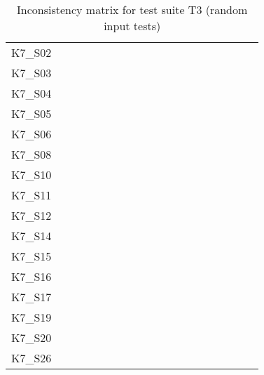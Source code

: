 \begin{table}
\begin{tabular}{l|rrrrrrrrrrrrrrrrrr}
        K7\_S02 & \y & \x & \y & \y & \y & \y & \y & \y & \y & \y & \y & \y & \y & \y & \y & \y & \y & \y \\
        K7\_S03 & \y & \x & \x & \y & \y & \y & \y & \x & \y & \y & \y & \x & \y & \y & \y & \y & \y & \y \\
        K7\_S04 & \y & \x & \x & \y & \y & \y & \y & \y & \y & \y & \y & \y & \y & \y & \x & \x & \y & \y \\
        K7\_S05 & \y & \y & \y & \y & \y & \y & \y & \y & \y & \y & \y & \y & \y & \y & \y & \x & \y & \y \\
        K7\_S06 & \y & \y & \y & \y & \y & \y & \y & \y & \y & \y & \y & \y & \y & \y & \y & \y & \y & \y \\
        K7\_S08 & \y & \x & \x & \y & \y & \y & \y & \y & \y & \y & \y & \y & \y & \y & \y & \y & \y & \y \\
        K7\_S10 & \y & \x & \x & \y & \y & \y & \y & \y & \y & \y & \y & \x & \y & \y & \x & \y & \y & \y \\
        K7\_S11 & \y & \y & \y & \y & \y & \y & \y & \y & \y & \y & \y & \y & \y & \y & \y & \y & \y & \y \\
        K7\_S12 & \y & \y & \y & \y & \y & \y & \y & \y & \y & \y & \y & \y & \x & \x & \x & \x & \y & \y \\
        K7\_S14 & \y & \y & \x & \y & \y & \y & \y & \y & \y & \y & \y & \y & \x & \x & \y & \x & \y & \y \\
        K7\_S15 & \y & \y & \y & \y & \y & \y & \y & \x & \y & \y & \y & \x & \y & \y & \y & \y & \y & \y \\
        K7\_S16 & \y & \x & \y & \y & \y & \y & \y & \y & \y & \y & \y & \x & \y & \y & \x & \y & \y & \y \\
        K7\_S17 & \y & \y & \y & \y & \x & \y & \y & \y & \y & \y & \y & \x & \y & \y & \x & \y & \y & \y \\
        K7\_S19 & \y & \y & \y & \y & \y & \y & \y & \x & \y & \y & \y & \y & \x & \y & \y & \y & \y & \y \\
        K7\_S20 & \y & \x & \x & \y & \y & \y & \y & \y & \y & \y & \y & \y & \y & \y & \y & \y & \y & \y \\
        K7\_S26 & \y & \y & \y & \y & \y & \y & \y & \y & \y & \y & \y & \y & \y & \x & \x & \x & \x & \y \\
        \bottomrule
    \end{tabular}
    \caption{Inconsistency matrix for test suite T3 (random input tests)}
    \label{tab:inconsistencies_matrix_random}
    \setlength{\tabcolsep}{\defaulttabcolsep}
\end{table}

